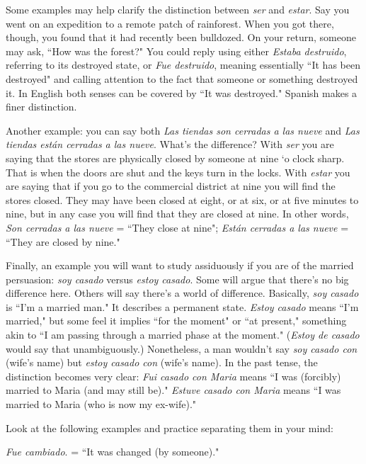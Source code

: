 Some examples may help clarify the distinction between \emph{ser}
and \emph{estar}. Say you went on an expedition to a remote patch of rainforest. When you got there, though, you found that it had recently been
bulldozed. On your return, someone may ask, ``How was the forest?"
You could reply using either \emph{Estaba destruido}, referring to its destroyed state, or \emph{Fue destruido}, meaning essentially ``It has been destroyed" and calling attention to the fact that someone or something
destroyed it. In English both senses can be covered by ``It was destroyed." Spanish makes a finer distinction.

Another example: you can say both \emph{Las tiendas son cerradas a
	las nueve} and \emph{Las tiendas están cerradas a las nueve}. What's the difference? With \emph{ser} you are saying that the stores are physically closed
by someone at nine `o clock sharp. That is when the doors are shut and
the keys turn in the locks. With \emph{estar} you are saying that if you go to
the commercial district at nine you will find the stores closed. They
may have been closed at eight, or at six, or at five minutes to nine, but
in any case you will find that they are closed at nine. In other words,
\emph{Son cerradas a las nueve} = ``They close at nine"; \emph{Están cerradas a las
	nueve} = ``They are closed by nine."

Finally, an example you will want to study assiduously if you
are of the married persuasion: \emph{soy casado} versus \emph{estoy casado}. Some
will argue that there's no big difference here. Others will say there's a
world of difference. Basically, \emph{soy casado} is ``I'm a married man." It
describes a permanent state. \emph{Estoy casado} means ``I'm married," but
some feel it implies ``for the moment" or ``at present," something akin
to ``I am passing through a married phase at the moment." (\emph{Estoy de
	casado} would say that unambiguously.) Nonetheless, a man wouldn't
say \emph{soy casado con} (wife's name) but \emph{estoy casado con} (wife's name).
In the past tense, the distinction becomes very clear: \emph{Fui casado con
	Maria} means ``I was (forcibly) married to Maria (and may still be)." \emph{Estuve casado con Maria} means ``I was married to Maria (who is now my ex-wife)."

Look at the following examples and practice separating them
in your mind:

\bsk

\indu \emph{Fue cambiado}. = ``It was changed (by someone)."

